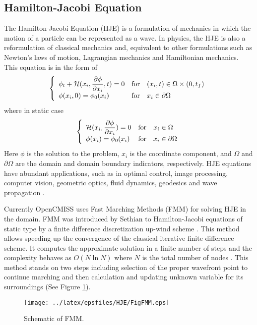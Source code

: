 \subsection{Hamilton-Jacobi Equation}
\noindent The Hamilton-Jacobi Equation (HJE) is a formulation of mechanics in which the motion of a particle can be represented as a wave. In physics, the HJE is also a reformulation of classical mechanics and, equivalent to other formulations such as Newton's laws of motion, Lagrangian mechanics and Hamiltonian mechanics. This equation is in the form of
\begin{eqnarray}
\left\{ \begin{array}{lcl} \phi_t + \mathcal{H}(x_i, \dfrac{\partial \phi}{\partial x_{i}} ,t) = 0 & \mbox{for} & (x_{i},t)\in\Omega\times(0,t_f) \\ \phi(x_i,0) = \phi_0(x_i)  & \mbox{for} & x_i\in\partial\Omega \end{array}\right.
\end{eqnarray}
where in static case 
\begin{eqnarray}
\left\{ \begin{array}{lcl} \mathcal{H}(x_i, \dfrac{\partial \phi}{\partial x_{i}} ) = 0 & \mbox{for} & x_i\in\Omega \\ \phi(x_i) = \phi_0(x_i)  & \mbox{for} & x_i\in\partial\Omega \end{array}\right. 
\end{eqnarray}
Here $\phi$ is the solution to the problem, $x_i$ is the coordinate component, and $\Omega$ and $\partial\Omega$ are the domain and domain boundary indicators, respectively.
HJE equations have abundant applications, such as in optimal control, image processing, computer vision, geometric optics, fluid dynamics, geodesics and wave propagation \cite{sethian:1999}.

\noindent Currently OpenCMISS uses Fast Marching Methods (FMM) for solving HJE in the domain. FMM was introduced by Sethian to Hamilton-Jacobi equations of static type by a finite difference discretization up-wind scheme \cite{sethian:1996}. This method allows speeding up the convergence of the classical iterative finite difference scheme. It computes the approximate solution in a finite number of steps and the complexity behaves as $O(N\ln N)$ where $N$ is the total number of nodes \cite{mauch:2003}. This method stands on two steps including selection of the proper wavefront point to continue marching and then calculation and updating unknown variable for its surroundings (See Figure \ref{fig:FMM}).

\begin{figure}[h!]
  \centering
    \texttt{[image: ../latex/epsfiles/HJE/FigFMM.eps]}
  \caption{Schematic of FMM.}
  \label{fig:FMM}
\end{figure}

